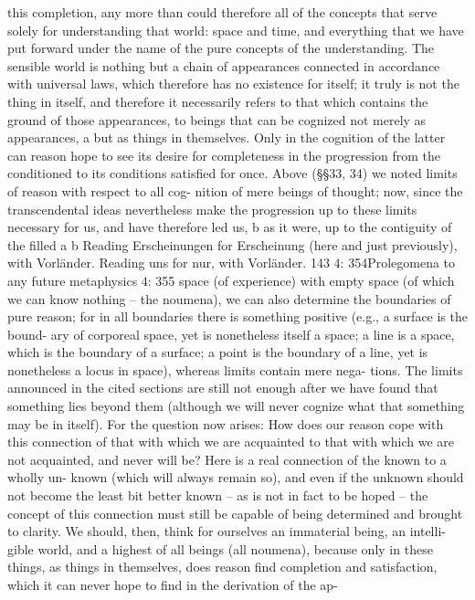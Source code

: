 this completion, any more than could therefore all of the concepts that
serve solely for understanding that world: space and time, and everything
that we have put forward under the name of the pure concepts of the
understanding. The sensible world is nothing but a chain of appearances
connected in accordance with universal laws, which therefore has no
existence for itself; it truly is not the thing in itself, and therefore it
necessarily refers to that which contains the ground of those appearances,
to beings that can be cognized not merely as appearances, a but as things
in themselves. Only in the cognition of the latter can reason hope to see
its desire for completeness in the progression from the conditioned to
its conditions satisﬁed for once.
Above (§§33, 34) we noted limits of reason with respect to all cog-
nition of mere beings of thought; now, since the transcendental ideas
nevertheless make the progression up to these limits necessary for us,
and have therefore led us, b as it were, up to the contiguity of the ﬁlled
a
b
Reading Erscheinungen for Erscheinung (here and just previously), with Vorländer.
Reading uns for nur, with Vorländer.
143
4: 354Prolegomena to any future metaphysics
4: 355
space (of experience) with empty space (of which we can know nothing –
the noumena), we can also determine the boundaries of pure reason; for
in all boundaries there is something positive (e.g., a surface is the bound-
ary of corporeal space, yet is nonetheless itself a space; a line is a space,
which is the boundary of a surface; a point is the boundary of a line,
yet is nonetheless a locus in space), whereas limits contain mere nega-
tions. The limits announced in the cited sections are still not enough
after we have found that something lies beyond them (although we will
never cognize what that something may be in itself). For the question
now arises: How does our reason cope with this connection of that with
which we are acquainted to that with which we are not acquainted, and
never will be? Here is a real connection of the known to a wholly un-
known (which will always remain so), and even if the unknown should
not become the least bit better known – as is not in fact to be hoped –
the concept of this connection must still be capable of being determined
and brought to clarity.
We should, then, think for ourselves an immaterial being, an intelli-
gible world, and a highest of all beings (all noumena), because only in
these things, as things in themselves, does reason ﬁnd completion and
satisfaction, which it can never hope to ﬁnd in the derivation of the ap-
